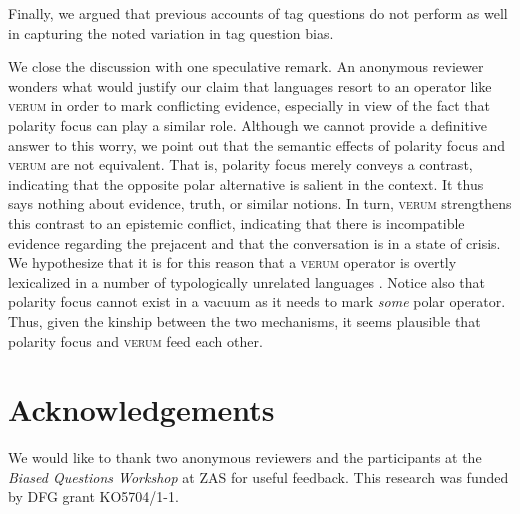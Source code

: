 \documentclass[output=paper,colorlinks,citecolor=brown]{langscibook}
\begin{document}
Finally, we argued that previous accounts of tag questions do not perform as well in capturing the noted variation in tag question bias.

We close the discussion with one speculative remark. An anonymous reviewer wonders what would justify our claim that languages resort to an operator like \textsc{verum} in order to mark conflicting evidence, especially in view of the fact that polarity focus can play a similar role. Although we cannot provide a definitive answer to this worry, we point out that the semantic effects of polarity focus and \textsc{verum} are not equivalent. That is, polarity focus merely conveys a contrast, indicating that the opposite polar alternative is salient in the context. It thus says nothing about evidence, truth, or similar notions. In turn, \textsc{verum} strengthens this contrast to an epistemic conflict, indicating that there is incompatible evidence regarding the prejacent and that the conversation is in a state of crisis. We hypothesize that it is for this reason that a \textsc{verum} operator is overtly lexicalized in a number of typologically unrelated languages \citep{Gutzmann2020}. Notice also that polarity focus cannot exist in a vacuum as it needs to mark \textit{some} polar operator. Thus, given the kinship between the two mechanisms, it seems plausible that polarity focus and \textsc{verum} feed each other.  


\section*{Acknowledgements}
We would like to thank two anonymous reviewers and the participants at the \textit{Biased Questions Workshop} at ZAS for useful feedback. This research was funded by DFG grant KO5704/1-1.

\printbibliography[heading=subbibliography,notkeyword=this]
\end{document}
